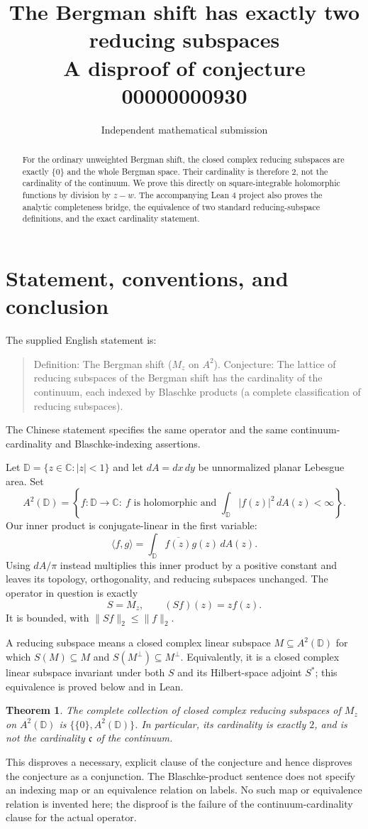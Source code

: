 \documentclass[11pt]{article}
\title{The Bergman shift has exactly two reducing subspaces\\
\large A disproof of conjecture 00000000930}
\author{Independent mathematical submission}
\date{}
\newtheorem{theorem}{Theorem}
\newcommand{\D}{\mathbb D}
\newcommand{\C}{\mathbb C}
\newcommand{\A}{A^2(\D)}
\newcommand{\ip}[2]{\langle #1,#2\rangle}
\newcommand{\norm}[1]{\lVert #1\rVert}
\begin{document}
\maketitle

\begin{abstract}
For the ordinary unweighted Bergman shift, the closed complex reducing
subspaces are exactly $\{0\}$ and the whole Bergman space. Their cardinality is
therefore $2$, not the cardinality of the continuum. We prove this directly on
square-integrable holomorphic functions by division by $z-w$. The accompanying
Lean 4 project also proves the analytic completeness bridge, the equivalence of
two standard reducing-subspace definitions, and the exact cardinality statement.
\end{abstract}

\section{Statement, conventions, and conclusion}
The supplied English statement is:
\begin{quote}
Definition: The Bergman shift ($M_z$ on $A^2$). Conjecture: The lattice of
reducing subspaces of the Bergman shift has the cardinality of the continuum,
each indexed by Blaschke products (a complete classification of reducing
subspaces).
\end{quote}
The Chinese statement specifies the same operator and the same
continuum-cardinality and Blaschke-indexing assertions.

Let $\D=\{z\in\C:|z|<1\}$ and let $dA=dx\,dy$ be unnormalized planar
Lebesgue area. Set
\[
 \A=\left\{ f:\D\to\C:\ f\text{ is holomorphic and }
                    \int_\D |f(z)|^2\,dA(z)<\infty\right\}.
\]
Our inner product is conjugate-linear in the first variable:
\[
 \ip f g=\int_\D \overline{f(z)}g(z)\,dA(z).
\]
Using $dA/\pi$ instead multiplies this inner product by a positive constant
and leaves its topology, orthogonality, and reducing subspaces unchanged.
The operator in question is exactly
\[
 S=M_z,\qquad (Sf)(z)=zf(z).
\]
It is bounded, with $\norm{Sf}_2\leq\norm f_2$.

A reducing subspace means a closed complex linear subspace $M\subseteq\A$
for which $S(M)\subseteq M$ and $S(M^\perp)\subseteq M^\perp$.
Equivalently, it is a closed complex linear subspace invariant under both
$S$ and its Hilbert-space adjoint $S^*$; this equivalence is proved below and
in Lean.

\begin{theorem}\label{thm:main}
The complete collection of closed complex reducing subspaces of $M_z$ on
$\A$ is $\{\{0\},\A\}$. In particular, its cardinality is exactly $2$, and
is not the cardinality $\mathfrak c$ of the continuum.
\end{theorem}
This disproves a necessary, explicit clause of the conjecture and hence
disproves the conjecture as a conjunction. The Blaschke-product sentence does
not specify an indexing map or an equivalence relation on labels. No such map
or equivalence relation is invented here; the disproof is the failure of the
continuum-cardinality clause for the actual operator.
\end{document}
